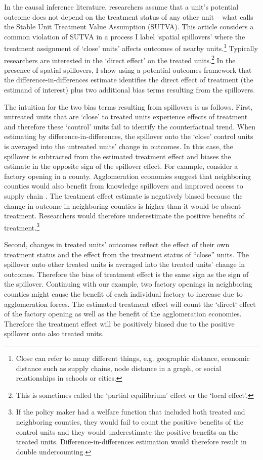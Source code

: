 \documentclass[11pt]{article}
\begin{document}
In the causal inference literature, researchers assume that a unit's potential outcome does not depend on the treatment status of any other unit -- what \citet{Rubin_1980} calls the Stable Unit Treatment Value Assumption (SUTVA). This article considers a common violation of SUTVA in a process I label `spatial spillovers' where the treatment assignment of `close' units' affects outcomes of nearby units.\footnote{Close can refer to many different things, e.g. geographic distance, economic distance such as supply chains, node distance in a graph, or social relationships in schools or cities.} Typically researchers are interested in the `direct effect' on the treated units.\footnote{This is sometimes called the `partial equilibrium' effect or the `local effect'.} In the presence of spatial spillovers, I show using a potential outcomes framework that the difference-in-differences estimate identifies the direct effect of treatment (the estimand of interest) plus two additional bias terms resulting from the spillovers.

The intuition for the two bias terms resulting from spillovers is as follows. First, untreated units that are `close' to treated units experience effects of treatment and therefore these `control' units fail to identify the counterfactual trend. When estimating by difference-in-differences, the spillover onto the `close' control units is averaged into the untreated units' change in outcomes. In this case, the spillover is subtracted from the estimated treatment effect and biases the estimate in the opposite sign of the spillover effect. For example, consider a factory opening in a county. Agglomeration economies suggest that neighboring counties would also benefit from knowledge spillovers and improved access to supply chain \citep{Duranton_Puga_2003}. The treatment effect estimate is negatively biased because the change in outcome in neighboring counties is higher than it would be absent treatment. Researchers would therefore underestimate the positive benefits of treatment.\footnote{If the policy maker had a welfare function that included both treated and neighboring counties, they would fail to count the positive benefits of the control units and they would underestimate the positive benefits on the treated units. Difference-in-differences estimation would therefore result in double undercounting.}

Second, changes in treated units' outcomes reflect the effect of their own treatment status and the effect from the treatment status of ``close'' units. The spillover onto other treated units is averaged into the treated units' change in outcomes. Therefore the bias of treatment effect is the same sign as the sign of the spillover. Continuing with our example, two factory openings in neighboring counties might cause the benefit of each individual factory to increase due to agglomeration forces. The estimated treatment effect will count the `direct` effect of the factory opening as well as the benefit of the agglomeration economies. Therefore the treatment effect will be positively biased due to the positive spillover onto also treated units. 
\end{document}

